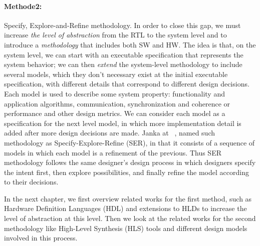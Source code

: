 \paragraph{Methode2:} Specify, Explore-and-Refine methodology.
In order to close this gap, we must increase \emph{the level of abstraction} from the RTL to the system level and to introduce a \emph{methodology} that includes both SW and HW.
The idea is that, on the system level, we can start with an executable specification that represents the system behavior; we can then \emph{extend} the system-level methodology to include several models, which they don't necessary exist at the initial executable specification, with different details that correspond to different design decisions.
Each model is used to describe some system property: functionality and application algorithms, communication, synchronization and coherence or performance and other design metrics.
We can consider each model as a specification for the next level model, in which more implementation detail is added after more design decisions are made.
Janka at ~\cite{janka_2002_specification}, named such methodology as Specify-Explore-Refine (SER), in that it consists of a sequence of models in which each model is a refinement of the previous.
Thus SER methodology follows the same designer's design process in which designers specify the intent first, then explore possibilities, and finally refine the model according to their decisions.

In the next chapter, we first overview related works for the first method, such as Hardware Definition Languages (HDL) and extensions to HLDs to increase the level of abstraction at this level. Then we look at the related works for the second methodology like High-Level Synthesis (HLS) tools and different design models involved in this process.